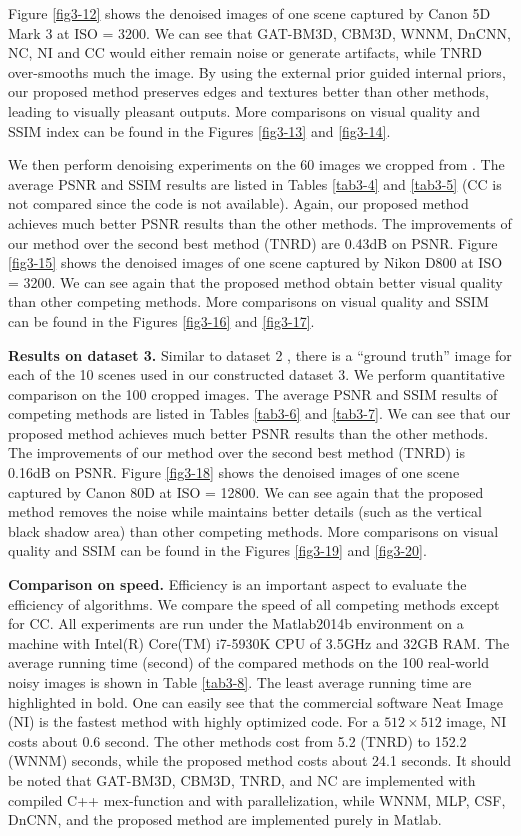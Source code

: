 Figure \ref{fig3-12} shows the denoised images of one scene captured by Canon 5D Mark 3 at ISO = 3200. We can see that GAT-BM3D, CBM3D, WNNM, DnCNN, NC, NI and CC would either remain noise or generate artifacts, while TNRD over-smooths much the image. By using the external prior guided internal priors, our proposed method preserves edges and textures better than other methods, leading to visually pleasant outputs. More comparisons on visual quality and SSIM \cite{ssim} index can be found in the Figures \ref{fig3-13} and \ref{fig3-14}.

We then perform denoising experiments on the 60 images we cropped from \cite{crosschannel2016}. The average PSNR and SSIM results are listed in Tables \ref{tab3-4} and \ref{tab3-5} (CC is not compared since the code is not available). Again, our proposed method achieves much better PSNR results than the other methods. The improvements of our method over the second best method (TNRD) are 0.43dB on PSNR. Figure \ref{fig3-15} shows the denoised images of one scene captured by Nikon D800 at ISO = 3200. We can see again that the proposed method obtain better visual quality than other competing methods. More comparisons on visual quality and SSIM can be found in the Figures \ref{fig3-16} and \ref{fig3-17}.

\textbf{Results on dataset 3.}
Similar to dataset 2 \cite{crosschannel2016}, there is a ``ground truth'' image for each of the 10 scenes used in our constructed dataset 3. We perform quantitative comparison on the 100 cropped images. The average PSNR and SSIM results of competing methods are listed in Tables \ref{tab3-6} and \ref{tab3-7}. We can see that our proposed method achieves much better PSNR results than the other methods. The improvements of our method over the second best method (TNRD) is 0.16dB on PSNR. Figure \ref{fig3-18} shows the denoised images of one scene captured by Canon 80D at ISO = 12800. We can see again that the proposed method removes the noise while maintains better details (such as the vertical black shadow area) than other competing methods. More comparisons on visual quality and SSIM can be found in the Figures \ref{fig3-19} and \ref{fig3-20}.

\textbf{Comparison on speed.}
Efficiency is an important aspect to evaluate the efficiency of algorithms. We compare the speed of all competing methods except for CC. All experiments are run under the Matlab2014b environment on a machine with Intel(R) Core(TM) i7-5930K CPU of 3.5GHz and 32GB RAM. The average running time (second) of the compared methods on the 100 real-world noisy images is shown in Table \ref{tab3-8}. The least average running time are highlighted in bold. One can easily see that the commercial software Neat Image (NI) is the fastest method with highly optimized code. For a $512\times512$ image, NI costs about 0.6 second. The other methods cost from 5.2 (TNRD) to 152.2 (WNNM) seconds, while the proposed method costs about 24.1 seconds. It should be noted that GAT-BM3D, CBM3D, TNRD, and NC are implemented with compiled C++ mex-function and with parallelization, while WNNM, MLP, CSF, DnCNN, and the proposed method are implemented purely in Matlab. 

